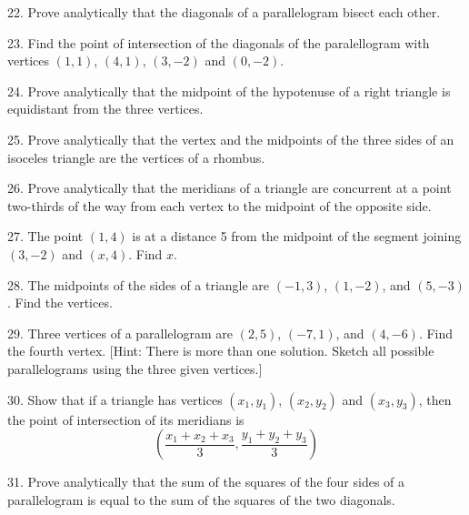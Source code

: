 \documentclass[10pt,letterpaper]{article}
\begin{document}
22. Prove analytically that the diagonals of a parallelogram bisect each other.

23. Find the point of intersection of the diagonals of the paralellogram with vertices $(1,1)$, $(4,1)$, $(3,-2)$ and $(0,-2)$.

24. Prove analytically that the midpoint of the hypotenuse of a right triangle is equidistant from the three vertices.

25. Prove analytically that the vertex and the midpoints of the three sides of an isoceles triangle are the vertices of a rhombus.

26. Prove analytically that the meridians of a triangle are concurrent at a point two-thirds of the way from each vertex to the midpoint of the opposite side.

27. The point $(1,4)$ is at a distance 5 from the midpoint of the segment joining $(3, -2)$ and $(x,4)$. Find $x$.

28. The midpoints of the sides of a triangle are $(-1,3)$, $(1,-2)$, and $(5,-3)$. Find the vertices.

29. Three vertices of a parallelogram are $(2,5)$, $(-7,1)$, and $(4,-6)$. Find the fourth vertex. [Hint: There is more than one solution. Sketch all possible parallelograms using the three given vertices.]

30. Show that if a triangle has vertices $(x_1,y_1)$, $(x_2,y_2)$ and $(x_3,y_3)$, then the point of intersection of its meridians is 
\[ \left(\frac{x_1 + x_2 + x_3}{3}, \frac{y_1 + y_2 + y_3}{3}\right) \]

31. Prove analytically that the sum of the squares of the four sides of a parallelogram is equal to the sum of the squares of the two diagonals.
\end{document}
